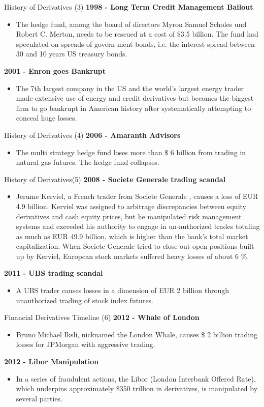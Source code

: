 {History of Derivatives (3)}
\textbf{1998 - Long Term Credit Management Bailout}
\begin{itemize}
  \item The hedge fund, among the board of directors Myron Samuel Scholes und Robert C. Merton, needs to be rescued at a cost of $\$$3.5 billion. The fund had speculated on spreads of govern-ment bonds, i.e. the interest spread between 30 and 10 years US treasury bonds.
\end{itemize}
\textbf{2001 - Enron goes Bankrupt}
\begin{itemize}
  \item The 7th largest company in the US and the world's largest energy trader made extensive use of energy and credit derivatives but becomes the biggest firm to go bankrupt in American history after systematically attempting to conceal huge losses.
\end{itemize}

{History of Derivatives (4)}
\textbf{2006 - Amaranth Advisors}
\begin{itemize}
  \item The multi strategy hedge fund loses more than $\$$ 6 billion from trading in natural gas futures. The hedge fund collapses.
\end{itemize}

{History of Derivatives(5)}
\textbf{2008 - Societe Generale trading scandal}
\begin{itemize}
  \item Jerume Kerviel, a French trader from Societe Generale , causes a loss of EUR 4.9 billion. Kerviel was assigned to arbitrage discrepancies between equity derivatives and cash equity prices, but he manipulated risk management systems and exceeded his authority to engage in un-authorized trades totaling as much as EUR 49.9 billion, which is higher than the bank's total market capitalization. When Societe Generale  tried to close out open positions built up by Kerviel, European stock markets suffered heavy losses of about 6 $\%$.
\end{itemize}
\textbf{2011 - UBS trading scandal}
\begin{itemize}
  \item A UBS trader causes losses in a dimension of EUR 2 billion through unauthorized trading of stock index futures.
\end{itemize}

{Financial Derivatives Timeline (6)}
\textbf{2012 - Whale of London}
\begin{itemize}
  \item Bruno Michael Iksli, nicknamed the London Whale, causes $\$$ 2 billion trading losses for JPMorgan with aggressive trading.
\end{itemize}
\textbf{2012 - Libor Manipulation}
\begin{itemize}
\item In a series of fraudulent actions, the Libor (London Interbank Offered Rate), which underpins approximately $\$$350 trillion in derivatives, is manipulated by several parties.
\end{itemize}

